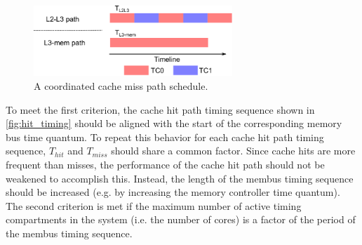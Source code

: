 \begin{figure}
    \begin{center}
        \includegraphics[width=2.9475in]{figs/coordination.eps}
        \caption{A coordinated cache miss path schedule.}
        \label{fig:coordination}
    \end{center}
\end{figure}

To meet the first criterion, the cache hit path timing sequence shown in 
\ref{fig:hit_timing} should be aligned with the start of the corresponding 
memory bus time quantum. To repeat this behavior for each cache hit path timing 
sequence, $T_{hit}$ and $T_{miss}$
should share a common factor. Since cache hits are more frequent than misses, 
the performance of the cache hit path should not be weakened to accomplish 
this. Instead, the length of the membus timing sequence should be increased 
(e.g. by increasing the memory controller time quantum). The second criterion 
is met if the maximum number of active timing compartments in the system (i.e.  
the number of cores) is a factor of the period of the membus timing sequence.
